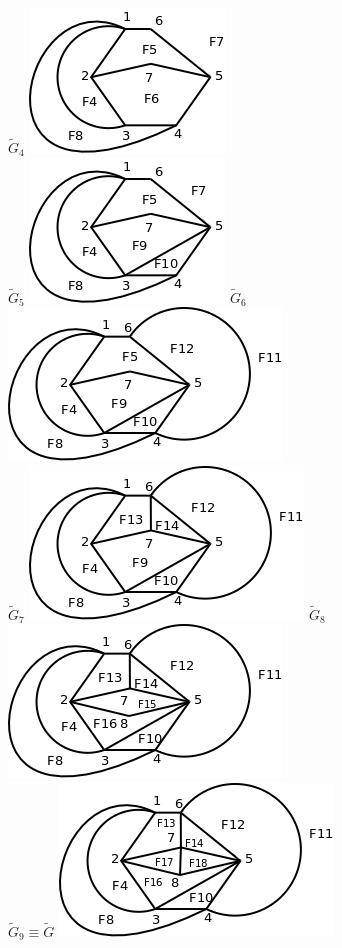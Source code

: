 \documentclass[10pt,a5paper]{book}
\begin{document}
\begin{figure}[H]
$\widetilde{G}_4$ \includegraphics[scale=.3]{Fig3_20_e.png} \\
\hspace*{.5in}$\widetilde{G}_5$ \includegraphics[scale=.3]{Fig3_20_f.png} 
$\widetilde{G}_6$ \includegraphics[scale=.3]{Fig3_20_g.png} \\
$\widetilde{G}_7$ \includegraphics[scale=.3]{Fig3_20_h.png} 
$\widetilde{G}_8$ \includegraphics[scale=.3]{Fig3_20_i.png}\\ 
$\widetilde{G}_9 \equiv \widetilde{G}$ \includegraphics[scale=.3]{Fig3_20_j.png}

\end{figure}
\end{document}
